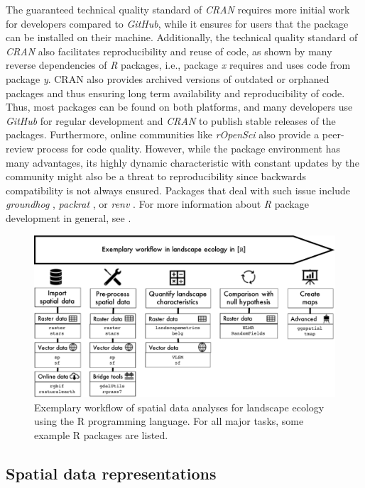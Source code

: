 \documentclass[smallextended]{svjour3}       %
\begin{document}
The guaranteed technical quality standard of \emph{CRAN} requires more initial work for developers compared to \emph{GitHub}, while it ensures for users that the package can be installed on their machine.
Additionally, the technical quality standard of \emph{CRAN} also facilitates reproducibility and reuse of code, as shown by many reverse dependencies of \emph{R} packages, i.e., package \emph{x} requires and uses code from package \emph{y}.
CRAN also provides archived versions of outdated or orphaned packages and thus ensuring long term availability and reproducibility of code.
Thus, most packages can be found on both platforms, and many developers use \emph{GitHub} for regular development and \emph{CRAN} to publish stable releases of the packages.
Furthermore, online communities like \emph{rOpenSci} also provide a peer-review process for code quality.
However, while the package environment has many advantages, its highly dynamic characteristic with constant updates by the community might also be a threat to reproducibility since backwards compatibility is not always ensured.
Packages that deal with such issue include \emph{groundhog} \cite{Simonsohn2021}, \emph{packrat} \cite{Ushey2018}, or \emph{renv} \cite{Ushey2020}.
For more information about \emph{R} package development in general, see \cite{Wickham2015}.

\begin{figure}
\includegraphics[width=1\linewidth,height=0.3\textheight]{data/Workflow} \caption{Exemplary workflow of spatial data analyses for landscape ecology using the R programming language. For all major tasks, some example R packages are listed.}\label{fig:fig-workflow}
\end{figure}

\hypertarget{sec:spatrep}{%
\subsection{Spatial data representations}\label{sec:spatrep}}
\end{document}

